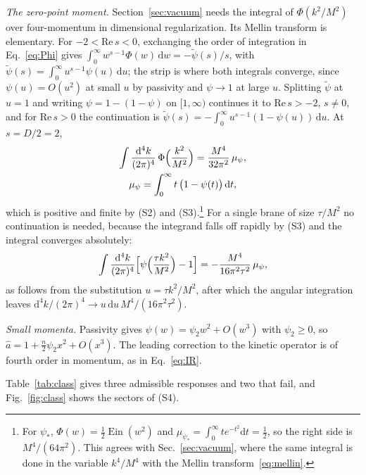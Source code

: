 \documentclass[a4paper,11pt]{article}
\newcommand{\dd}{\mathrm{d}}
\newcommand{\Ein}{\operatorname{Ein}}
\begin{document}
\textit{The zero-point moment.} Section~\ref{sec:vacuum} needs the integral of $\Phi(k^2/M^2)$ over four-momentum in dimensional regularization. Its Mellin transform is elementary. For $-2<\mathrm{Re}\,s<0$, exchanging the order of integration in Eq.~\eqref{eq:Phi} gives $\int_0^\infty w^{s-1}\Phi(w)\,\dd w=-\tilde\psi(s)/s$, with $\tilde\psi(s)=\int_0^\infty u^{s-1}\psi(u)\,\dd u$; the strip is where both integrals converge, since $\psi(u)=O(u^2)$ at small $u$ by passivity and $\psi\to1$ at large $u$. Splitting $\tilde\psi$ at $u=1$ and writing $\psi=1-(1-\psi)$ on $[1,\infty)$ continues it to $\mathrm{Re}\,s>-2$, $s\ne0$, and for $\mathrm{Re}\,s>0$ the continuation is $\tilde\psi(s)=-\int_0^\infty u^{s-1}(1-\psi(u))\,\dd u$. At $s=D/2=2$,
\begin{equation}
\label{eq:moment}
\begin{gathered}
\int\frac{\dd^4k}{(2\pi)^4}\,\Phi\Bigl(\frac{k^2}{M^2}\Bigr)=\frac{M^4}{32\pi^2}\,\mu_\psi,\\
\mu_\psi=\int_0^\infty t\,\bigl(1-\psi(t)\bigr)\,\dd t ,
\end{gathered}
\end{equation}
which is positive and finite by (S2) and (S3).\footnote{For $\psi_*$, $\Phi(w)=\frac12\Ein(w^2)$ and $\mu_{\psi_*}=\int_0^\infty te^{-t^2}\dd t=\frac12$, so the right side is $M^4/(64\pi^2)$. This agrees with Sec.~\ref{sec:vacuum}, where the same integral is done in the variable $k^4/M^4$ with the Mellin transform~\eqref{eq:mellin}.} For a single brane of size $\tau/M^2$ no continuation is needed, because the integrand falls off rapidly by (S3) and the integral converges absolutely:
\begin{equation}
\label{eq:moment1}
\int\frac{\dd^4k}{(2\pi)^4}\Bigl[\psi\Bigl(\frac{\tau k^2}{M^2}\Bigr)-1\Bigr]=-\frac{M^4}{16\pi^2\tau^2}\,\mu_\psi ,
\end{equation}
as follows from the substitution $u=\tau k^2/M^2$, after which the angular integration leaves $\dd^4k/(2\pi)^4\to u\,\dd u\,M^4/(16\pi^2\tau^2)$.

\textit{Small momenta.} Passivity gives $\psi(w)=\psi_2w^2+O(w^3)$ with $\psi_2\ge0$, so $\hat a=1+\frac n2\psi_2x^2+O(x^3)$. The leading correction to the kinetic operator is of fourth order in momentum, as in Eq.~\eqref{eq:IR}.

Table~\ref{tab:class} gives three admissible responses and two that fail, and Fig.~\ref{fig:class} shows the sectors of (S4).
\end{document}
